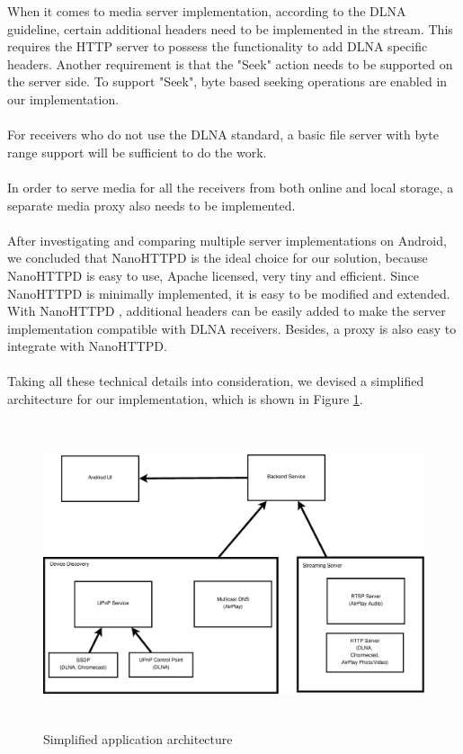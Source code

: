 When it comes to media server implementation, according to the DLNA guideline,
certain additional headers need to be implemented in the stream. This
requires the HTTP server to possess the functionality to add DLNA specific
headers. Another requirement is that the "Seek" action needs to be supported on the server side. To support "Seek", byte based seeking operations are enabled in our implementation.\\
\\
For receivers who do not use the DLNA standard, a basic file server with byte range support will be sufficient to do the work.\\
\\
In order to serve media for all the receivers from both online and local storage, a separate media proxy also needs to be implemented.\\
\\
After investigating and comparing multiple server implementations on Android, we
concluded that NanoHTTPD is the ideal choice for our solution, because NanoHTTPD is easy to use,
Apache licensed, very tiny and efficient. Since NanoHTTPD is minimally implemented, it is easy to be modified and extended. With NanoHTTPD , additional headers can be easily added to make the server implementation compatible with DLNA receivers. Besides, a proxy is also easy to integrate with  NanoHTTPD.\\
\\
Taking all these technical details into consideration, we devised a simplified
architecture for our implementation, which is shown in Figure \ref{chart3}.
\begin{figure}[htb]
\centering \includegraphics[height=9cm]{charts/chart3}
\caption{Simplified application architecture\label{chart3}}
\end{figure}\\
